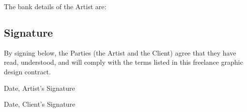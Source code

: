 \documentclass[10pt]{scrartcl}
\begin{document}
The bank details of the Artist are:

\begin{mdframed}
  \vspace{2.5cm}
\end{mdframed}

\subsection{Signature}

By signing below, the Parties (the Artist and the Client) agree that they have
read, understood, and will comply with the terms listed in this freelance
graphic design contract.

\begin{minipage}[t]{.48\textwidth}
  \begin{mdframed}
    \vspace{3cm}
    \centering
    Date, Artist's Signature
  \end{mdframed}
\end{minipage}
\hfill
\begin{minipage}[t]{.48\textwidth}
  \begin{mdframed}
    \vspace{3cm}
    \centering
    Date, Client's Signature
  \end{mdframed}
\end{minipage}%
\end{document}

